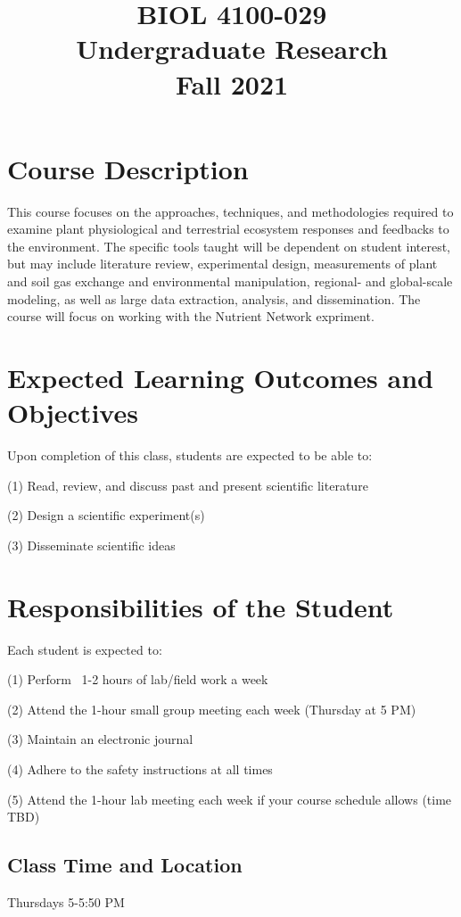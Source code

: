 \documentclass[12pt, notitlepage]{article}   	%
\title{
	\textbf{
		BIOL 4100-029
	} \\
	\large Undergraduate Research \\
	\large Fall 2021
}
\date{\vspace{-5ex}}
\begin{document}
{\selectfont %

\maketitle

\section{Course Description}
This course focuses on the approaches, techniques, and methodologies required to examine 
plant physiological and terrestrial ecosystem responses and feedbacks to the environment. 
The specific tools taught will be dependent on student interest, 
but may include literature review, experimental design, measurements of plant and soil gas 
exchange and environmental manipulation, regional- and global-scale modeling, 
as well as large data extraction, analysis, and dissemination. The course will focus on
working with the Nutrient Network expriment.

\section{Expected Learning Outcomes and Objectives}
Upon completion of this class, students are expected to be able to:\par
(1)	Read, review, and discuss past and present scientific literature\par
(2) Design a scientific experiment(s)\par
(3) Disseminate scientific ideas\par

\section{Responsibilities of the Student}
Each student is expected to:\par
(1) Perform ~1-2 hours of lab/field work a week\par
(2) Attend the 1-hour small group meeting each week (Thursday at 5 PM)\par
(3) Maintain an electronic journal\par
(4) Adhere to the safety instructions at all times\par
(5) Attend the 1-hour lab meeting each week if your course schedule allows (time TBD)\par

\subsection{Class Time and Location}
Thursdays 5-5:50 PM

}
\end{document}
